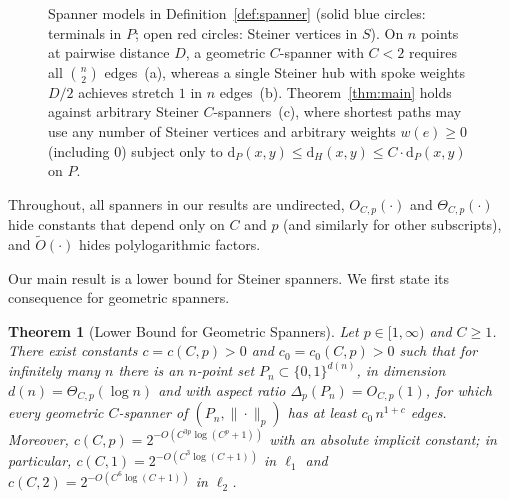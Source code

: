 \documentclass[11pt]{article}
\newtheorem{theorem}{Theorem}[section]
\theoremstyle{definition}
\theoremstyle{remark}
\newcommand{\dH}{\mathrm{d}_H}
\newcommand{\dP}{\mathrm{d}_P}
\begin{document}
\begin{figure}[ht]
\caption{Spanner models in Definition~\ref{def:spanner} (solid blue circles: terminals in $P$; open red circles: Steiner vertices in $S$). On $n$ points at pairwise distance $D$, a geometric $C$-spanner with $C < 2$ requires all $\binom{n}{2}$ edges~(a), whereas a single Steiner hub with spoke weights $D/2$ achieves stretch $1$ in $n$ edges~(b). Theorem~\ref{thm:main} holds against arbitrary Steiner $C$-spanners~(c), where shortest paths may use any number of Steiner vertices and arbitrary weights $w(e) \ge 0$ (including $0$) subject only to $\dP(x, y) \le \dH(x, y) \le C \cdot \dP(x, y)$ on $P$.}
\label{fig:spanner-models}
\end{figure}

Throughout, all spanners in our results are undirected, $O_{C, p}(\cdot)$ and $\Theta_{C, p}(\cdot)$ hide constants that depend only on $C$ and $p$ (and similarly for other subscripts), and $\tilde{O}(\cdot)$ hides polylogarithmic factors.

Our main result is a lower bound for Steiner spanners. We first state its consequence for geometric spanners.

\begin{theorem}[Lower Bound for Geometric Spanners]
\label{thm:geometric}
Let $p \in [1, \infty)$ and $C \ge 1$. There exist constants $c = c(C, p) > 0$ and $c_0 = c_0(C, p) > 0$ such that for infinitely many $n$ there is an $n$-point set $P_n \subset \{0, 1\}^{d(n)}$, in dimension $d(n) = \Theta_{C, p}(\log n)$ and with aspect ratio $\Delta_p(P_n) = O_{C, p}(1)$, for which every geometric $C$-spanner of $(P_n, \|\cdot\|_p)$ has at least $c_0\, n^{1 + c}$ edges. Moreover, $c(C, p) = 2^{-O(C^{3p}\log(C^p + 1))}$ with an absolute implicit constant; in particular, $c(C, 1) = 2^{-O(C^3 \log(C + 1))}$ in $\ell_1$ and $c(C, 2) = 2^{-O(C^6 \log(C + 1))}$ in $\ell_2$.
\end{theorem}
\end{document}
